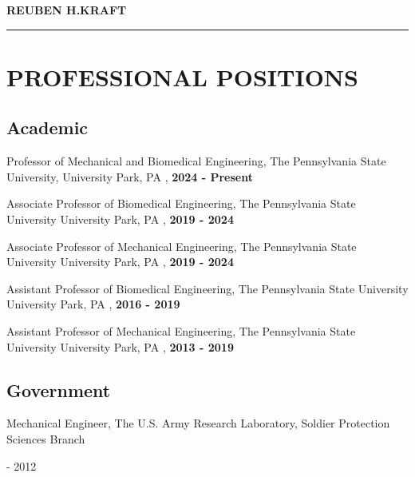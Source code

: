 \documentclass[a4paper,10pt]{article}
\author{}
\date{}
\begin{document}
    \begin{center}
    \LARGE \textbf{\textsc{REUBEN H.KRAFT}} \\
    \rule{\linewidth}{2pt}
    \end{center}
    \normalsize %
    


    \section*{PROFESSIONAL POSITIONS}
    
    \subsection*{Academic}
    
                \noindent Professor of Mechanical and Biomedical Engineering, The Pennsylvania State University, University Park, PA , \textbf{2024 - Present}\vspace{0.25cm}
                
                \noindent Associate Professor of Biomedical Engineering, The Pennsylvania State University
University Park, PA , \textbf{2019 - 2024}\vspace{0.25cm}
                
                \noindent Associate Professor of Mechanical Engineering, The Pennsylvania State University
University Park, PA , \textbf{2019 - 2024}\vspace{0.25cm}
                
                \noindent Assistant Professor of Biomedical Engineering, The Pennsylvania State University
University Park, PA , \textbf{2016 - 2019}\vspace{0.25cm}
                
                \noindent Assistant Professor of Mechanical Engineering, The Pennsylvania State University
University Park, PA , \textbf{2013 - 2019}\vspace{0.25cm}
                
    \subsection*{Government}
    
                \noindent \parbox[t]{0.8\linewidth}{\raggedright Mechanical Engineer, The U.S. Army Research Laboratory, Soldier Protection Sciences Branch} \hfill \parbox[t]{0.2\linewidth}{ - 2012} \\
                
\end{document}
